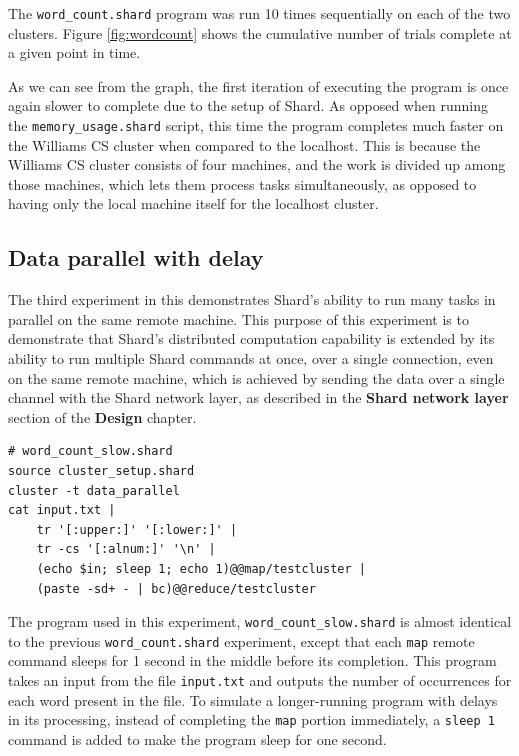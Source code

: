 \documentclass[twoside]{report}
\begin{document}
The \texttt{word\_count.shard} program was run 10 times sequentially on each of the two clusters.
Figure \ref{fig:wordcount} shows the cumulative number of trials complete at a given point in time.

As we can see from the graph, the first iteration of executing the program is once again slower to complete due to the setup of Shard.
As opposed when running the \texttt{memory\_usage.shard} script, this time the program completes much faster on the Williams CS cluster when compared to the localhost.
This is because the Williams CS cluster consists of four machines, and the work is divided up among those machines, which lets them process tasks simultaneously, as opposed to having only the local machine itself for the localhost cluster.

\subsection{Data parallel with delay}
The third experiment in this demonstrates Shard's ability to run many tasks in parallel on the same remote machine.
This purpose of this experiment is to demonstrate that Shard's distributed computation capability is extended by its ability to run multiple Shard commands at once, over a single connection, even on the same remote machine, which is achieved by sending the data over a single channel with the Shard network layer, as described in the \textbf{Shard network layer} section of the \textbf{Design} chapter.

\begin{minipage}[c]{\textwidth-15pt}
  \begin{lstlisting}[language=Shard]
# word_count_slow.shard
source cluster_setup.shard
cluster -t data_parallel
cat input.txt |
    tr '[:upper:]' '[:lower:]' |
    tr -cs '[:alnum:]' '\n' |
    (echo $in; sleep 1; echo 1)@@map/testcluster |
    (paste -sd+ - | bc)@@reduce/testcluster
\end{lstlisting}
  \smallskip
\end{minipage}

The program used in this experiment, \texttt{word\_count\_slow.shard} is almost identical to the previous \texttt{word\_count.shard} experiment, except that each \texttt{map} remote command sleeps for 1 second in the middle before its completion.
This program takes an input from the file \texttt{input.txt} and outputs the number of occurrences for each word present in the file.
To simulate a longer-running program with delays in its processing, instead of completing the \texttt{map} portion immediately, a \texttt{sleep 1} command is added to make the program sleep for one second.
\end{document}
